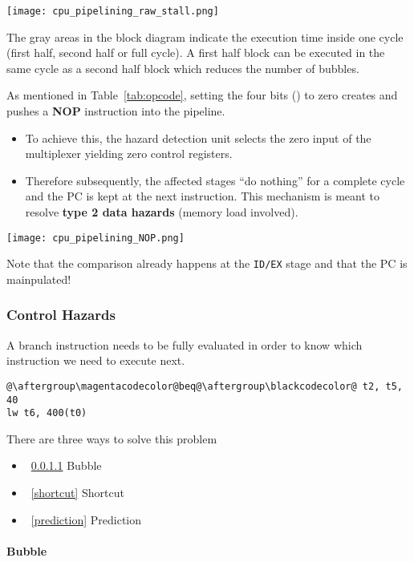 \texttt{[image: cpu\_pipelining\_raw\_stall.png]}

The gray areas in the block diagram indicate the execution time inside one cycle (first half, second half or full cycle). A first half block can be executed in the same cycle as a second half block which reduces the number of bubbles.

\newpar{}
As mentioned in Table~\ref{tab:opcode}, setting the four bits () to zero creates and pushes a \textbf{NOP} instruction into the pipeline. 
\begin{itemize}
    \item To achieve this, the hazard detection unit selects the zero input of the multiplexer yielding zero control registers.
    \item Therefore subsequently, the affected stages ``do nothing'' for a complete cycle and the PC is kept at the next instruction. This mechanism is meant to resolve \textbf{type 2 data hazards} (memory load involved).
\end{itemize}
\begin{center}
    \texttt{[image: cpu\_pipelining\_NOP.png]}
\end{center}
Note that the comparison already happens at the \texttt{ID/EX} stage and that the PC is mainpulated!

\subsubsection{Control Hazards}\label{control hazards}

A branch instruction needs to be fully evaluated in order to know which instruction we need to execute next.

\begin{lstlisting}[escapechar=@]
@\aftergroup\magentacodecolor@beq@\aftergroup\blackcodecolor@ t2, t5, 40
lw t6, 400(t0)
\end{lstlisting}

There are three ways to solve this problem
\begin{itemize}
    \item~\ref{bubble} Bubble
    \item~\ref{shortcut} Shortcut
    \item~\ref{prediction} Prediction
\end{itemize}

\paragraph{Bubble}\label{bubble}

